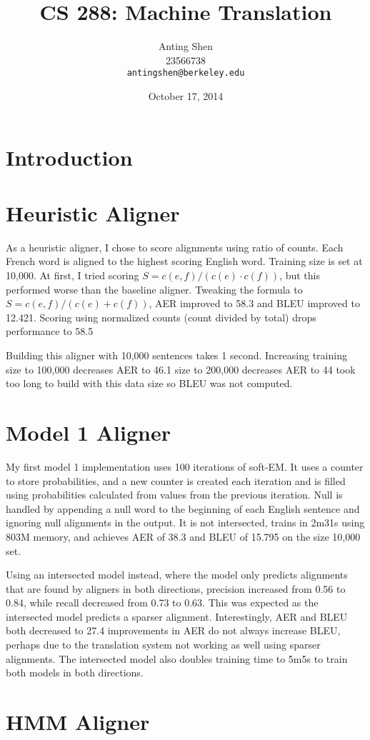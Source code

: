 \documentclass[11pt]{article}
\title{CS 288: Machine Translation}
\author{Anting Shen \\
  23566738 \\
  {\tt antingshen@berkeley.edu} \\
}
\date{October 17, 2014}
\begin{document}
\maketitle

\section{Introduction}


\section{Heuristic Aligner}

As a heuristic aligner, I chose to score alignments using ratio of counts. Each French word
is aligned to the highest scoring English word. Training size is set at 10,000.
At first, I tried scoring $S = c(e, f) / (c(e) \cdot c(f))$, but this performed worse than the
baseline aligner. Tweaking the formula to $S = c(e, f) / (c(e) + c(f))$, AER improved to 58.3%
and BLEU improved to 12.421. Scoring using normalized counts (count divided by total) drops
performance to 58.5%

Building this aligner with 10,000 sentences takes 1 second. Increasing training size to 100,000
decreases AER to 46.1%
size to 200,000 decreases AER to 44%
took too long to build with this data size so BLEU was not computed.

\section{Model 1 Aligner}

My first model 1 implementation uses 100 iterations of soft-EM. It uses a counter to store
probabilities, and a new counter is created each iteration and is filled using probabilities
calculated from values from the previous iteration. Null is handled by appending a null word to
the beginning of each English sentence and ignoring null alignments in the output.
It is not intersected, trains in 2m31s using 803M memory, and achieves AER of 38.3%
and BLEU of 15.795 on the size 10,000 set.

Using an intersected model instead, where the model only predicts alignments that are found by
aligners in both directions, precision increased from 0.56 to 0.84, while recall decreased from
0.73 to 0.63. This was expected as the intersected model predicts a sparser alignment.
Interestingly, AER and BLEU both decreased to 27.4%
improvements in AER do not always increase BLEU, perhaps due to the translation system
not working as well using sparser alignments. The intersected model also doubles training time
to 5m5s to train both models in both directions.

\section{HMM Aligner}
\end{document}
